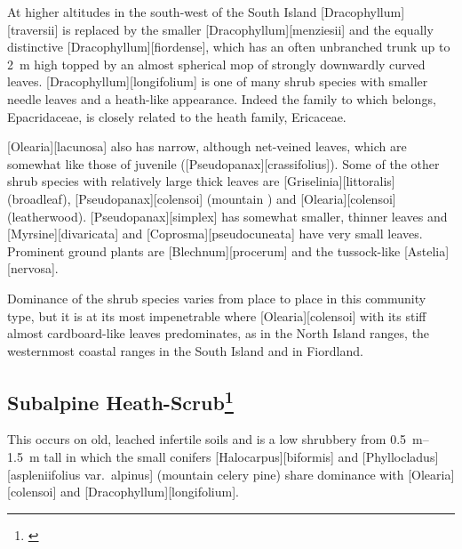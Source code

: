 At higher altitudes in the south-west of the South Island [Dracophyllum][traversii] is replaced by the smaller [Dracophyllum][menziesii] and the equally distinctive [Dracophyllum][fiordense], which has an often unbranched trunk up to \SI{2}{\metre} high topped by an almost spherical mop of strongly downwardly curved leaves. [Dracophyllum][longifolium] is one of many shrub species with smaller needle leaves and a heath-like appearance.
Indeed the family to which  belongs, Epacridaceae, is closely related to the heath family, Ericaceae.

[Olearia][lacunosa] also has narrow, although net-veined leaves, which are somewhat like those of juvenile  ([Pseudopanax][crassifolius]).
Some of the other shrub species with relatively large thick leaves are [Griselinia][littoralis] (broadleaf), [Pseudopanax][colensoi] (mountain ) and [Olearia][colensoi] (leatherwood). [Pseudopanax][simplex] has somewhat smaller, thinner leaves and [Myrsine][divaricata] and [Coprosma][pseudocuneata] have very small leaves.
Prominent ground plants are [Blechnum][procerum] and the tussock-like [Astelia][nervosa].

Dominance of the shrub species varies from place to place in this community type, but it is at its most impenetrable where [Olearia][colensoi] with its stiff almost cardboard-like leaves predominates, as in the North Island ranges, the westernmost coastal ranges in the South Island and in Fiordland.

\subsection[Subalpine Heath-Scrub]{Subalpine Heath-Scrub\thinspace\footnote{\cite{burrows1979heathlands}}}

This occurs on old, leached infertile soils and is a low shrubbery from \SIrange{0.5}{1.5}{\metre} tall in which the small conifers [Halocarpus][biformis] and [Phyllocladus][aspleniifolius var.\ alpinus] (mountain celery pine) share dominance with [Olearia][colensoi] and [Dracophyllum][longifolium].

